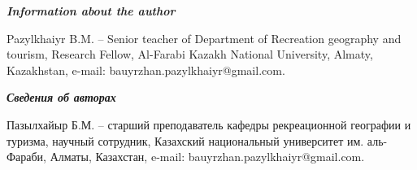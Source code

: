 \emph{{\bfseries Information about the author}}

\begin{noparindent}
Pazylkhaiyr B.M. -- Senior teacher of Department of Recreation geography
and tourism, Research Fellow, Al-Farabi Kazakh National University,
Almaty, Kazakhstan, e-mail: bauyrzhan.pazylkhaiyr@gmail.com.
\end{noparindent}

\emph{{\bfseries Сведения об авторах}}

\begin{noparindent}
Пазылхайыр Б.М. -- старший преподаватель кафедры рекреационной географии
и туризма, научный сотрудник, Казахский национальный университет им.
аль-Фараби, Алматы, Казахстан, e-mail: bauyrzhan.pazylkhaiyr@gmail.com.
\end{noparindent}

